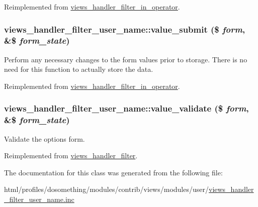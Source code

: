 Reimplemented from \hyperlink{classviews__handler__filter__in__operator_a6736083657cad0f8c7299b000f2b8e60}{views\_\-handler\_\-filter\_\-in\_\-operator}.\hypertarget{classviews__handler__filter__user__name_a35fcdce7daf9bf61ea69bee242d48cf2}{
\subsubsection[{value\_\-submit}]{\setlength{\rightskip}{0pt plus 5cm}views\_\-handler\_\-filter\_\-user\_\-name::value\_\-submit (\$ {\em form}, \/  \&\$ {\em form\_\-state})}}
\label{classviews__handler__filter__user__name_a35fcdce7daf9bf61ea69bee242d48cf2}
Perform any necessary changes to the form values prior to storage. There is no need for this function to actually store the data. 

Reimplemented from \hyperlink{classviews__handler__filter__in__operator_af7b01b1f4e53aec7f4b1065606819624}{views\_\-handler\_\-filter\_\-in\_\-operator}.\hypertarget{classviews__handler__filter__user__name_a5da3e22c33761d6902fc99cabba66a41}{
\subsubsection[{value\_\-validate}]{\setlength{\rightskip}{0pt plus 5cm}views\_\-handler\_\-filter\_\-user\_\-name::value\_\-validate (\$ {\em form}, \/  \&\$ {\em form\_\-state})}}
\label{classviews__handler__filter__user__name_a5da3e22c33761d6902fc99cabba66a41}
Validate the options form. 

Reimplemented from \hyperlink{classviews__handler__filter_a55b051bcd047b7251e6dbbece8e0a081}{views\_\-handler\_\-filter}.

The documentation for this class was generated from the following file:\begin{DoxyCompactItemize}
\item 
html/profiles/dosomething/modules/contrib/views/modules/user/\hyperlink{views__handler__filter__user__name_8inc}{views\_\-handler\_\-filter\_\-user\_\-name.inc}\end{DoxyCompactItemize}
